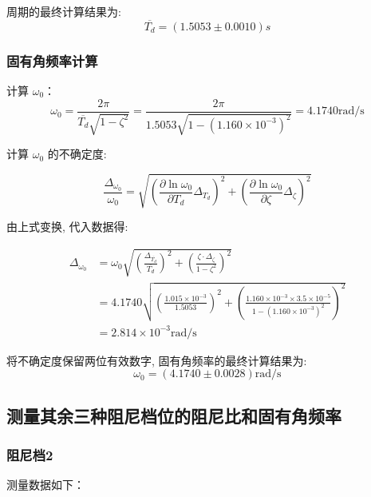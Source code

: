 \documentclass[UTF8]{ctexart}
\begin{document}
    周期的最终计算结果为:
    $$
    \overline{T_{d}}=(1.5053 \pm 0.0010) s
    $$
        
    \subsubsection{固有角频率计算}
    计算  $\omega_{0} $：
    $$
    \omega_{0}=\frac{2 \pi}{\overline{T_{d}} \sqrt{1-\zeta^{2}}}=\frac{2 \pi}{1.5053 \sqrt{1-\left(1.160 \times 10^{-3}\right)^{2}}}=4.1740 \mathrm{rad} / \mathrm{s}
    $$

    计算  $\omega_{0} $ 的不确定度:

    $$
    \frac{\Delta_{\omega_{0}}}{\omega_{0}}=\sqrt{\left(\frac{\partial \ln \omega_{0}}{\partial T_{d}} \Delta_{T_{d}}\right)^{2}+\left(\frac{\partial \ln \omega_{0}}{\partial \zeta} \Delta_{\zeta}\right)^{2}}
    $$

    由上式变换, 代入数据得:
    
    \begin{align}
    \Delta_{\omega_{0}}&=\omega_{0} \sqrt{\left(\frac{\Delta_{\overline{T_{d}}}}{\overline{T_{d}}}\right)^{2}+\left(\frac{\zeta \cdot \Delta_{\zeta}}{1-\zeta^{2}}\right)^{2}} \nonumber \\
    &=4.1740 \sqrt{\left(\frac{1.015 \times 10^{-3}}{1.5053}\right)^{2}+\left(\frac{1.160 \times 10^{-3} \times 3.5 \times 10^{-5}}{1-\left(1.160 \times 10^{-3}\right)^{2}}\right)^{2}} \nonumber\\
    &=2.814 \times 10^{-3} \mathrm{rad} / \mathrm{s} \nonumber
    \end{align}
    
    将不确定度保留两位有效数字, 固有角频率的最终计算结果为:
    $$
    \omega_{0}=(4.1740 \pm 0.0028) \mathrm{rad} / \mathrm{s}
    $$



\subsection{测量其余三种阻尼档位的阻尼比和固有角频率}

\subsubsection{阻尼档2}

测量数据如下：
\end{document}
